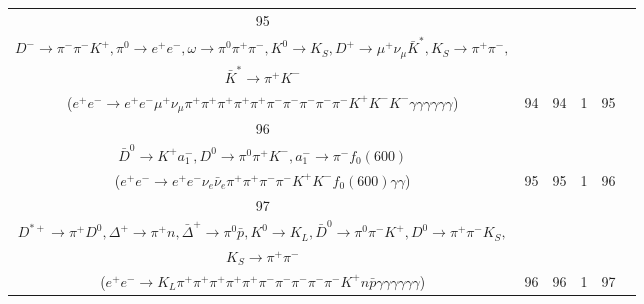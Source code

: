 \documentclass[landscape]{article}
\begin{document}
\begin{table}[htbp!]
\begin{tabular}{|c|c|c|c|c|c|}
\hline
95 & \makecell{ $ 
e^{+} e^{-} \rightarrow \Upsilon(4S) ,
\Upsilon(4S) \rightarrow B^{0} \bar{B}^{0} ,
B^{0} \rightarrow \rho^{+} \omega D^{-} ,
\bar{B}^{0} \rightarrow \pi^{0} \omega K^{0} K^{-} D^{+} ,
\rho^{+} \rightarrow \pi^{0} \pi^{+} ,
\omega \rightarrow \pi^{0} \pi^{+} \pi^{-} ,
$ \\ $
D^{-} \rightarrow \pi^{-} \pi^{-} K^{+} ,
\pi^{0} \rightarrow e^{+} e^{-} ,
\omega \rightarrow \pi^{0} \pi^{+} \pi^{-} ,
K^{0} \rightarrow K_{S} ,
D^{+} \rightarrow \mu^{+} \nu_{\mu} \bar{K}^{*} ,
K_{S} \rightarrow \pi^{+} \pi^{-} ,
$ \\ $
\bar{K}^{*} \rightarrow \pi^{+} K^{-} 
$ \\ ($
e^{+} e^{-} \rightarrow e^{+} e^{-} \mu^{+} \nu_{\mu} \pi^{+} \pi^{+} \pi^{+} \pi^{+} \pi^{+} \pi^{-} \pi^{-} \pi^{-} \pi^{-} \pi^{-} K^{+} K^{-} K^{-} \gamma \gamma \gamma \gamma \gamma \gamma 
$) } & 94 & 94 & 1 & 95 \\
\hline
96 & \makecell{ $ 
e^{+} e^{-} \rightarrow \Upsilon(4S) ,
\Upsilon(4S) \rightarrow B^{0} \bar{B}^{0} ,
B^{0} \rightarrow e^{+} \nu_{e} \bar{D}^{*-} ,
\bar{B}^{0} \rightarrow e^{-} \bar{\nu}_{e} D^{*+} ,
\bar{D}^{*-} \rightarrow \pi^{-} \bar{D}^{0} ,
D^{*+} \rightarrow \pi^{+} D^{0} ,
$ \\ $
\bar{D}^{0} \rightarrow K^{+} a_{1}^{-} ,
D^{0} \rightarrow \pi^{0} \pi^{+} K^{-} ,
a_{1}^{-} \rightarrow \pi^{-} f_{0}(600) 
$ \\ ($
e^{+} e^{-} \rightarrow e^{+} e^{-} \nu_{e} \bar{\nu}_{e} \pi^{+} \pi^{+} \pi^{-} \pi^{-} K^{+} K^{-} f_{0}(600) \gamma \gamma 
$) } & 95 & 95 & 1 & 96 \\
\hline
97 & \makecell{ $ 
e^{+} e^{-} \rightarrow \Upsilon(4S) ,
\Upsilon(4S) \rightarrow B^{0} \bar{B}^{0} ,
B^{0} \rightarrow K^{*+} \bar{D}^{*-} ,
\bar{B}^{0} \rightarrow \pi^{0} \pi^{-} D^{*+} \Delta^{+} \bar{\Delta}^{+} ,
K^{*+} \rightarrow \pi^{+} K^{0} ,
\bar{D}^{*-} \rightarrow \pi^{-} \bar{D}^{0} ,
$ \\ $
D^{*+} \rightarrow \pi^{+} D^{0} ,
\Delta^{+} \rightarrow \pi^{+} n ,
\bar{\Delta}^{+} \rightarrow \pi^{0} \bar{p} ,
K^{0} \rightarrow K_{L} ,
\bar{D}^{0} \rightarrow \pi^{0} \pi^{-} K^{+} ,
D^{0} \rightarrow \pi^{+} \pi^{-} K_{S} ,
$ \\ $
K_{S} \rightarrow \pi^{+} \pi^{-} 
$ \\ ($
e^{+} e^{-} \rightarrow K_{L} \pi^{+} \pi^{+} \pi^{+} \pi^{+} \pi^{+} \pi^{-} \pi^{-} \pi^{-} \pi^{-} \pi^{-} K^{+} n \bar{p} \gamma \gamma \gamma \gamma \gamma \gamma 
$) } & 96 & 96 & 1 & 97 \\

\end{tabular}
\end{table}
\end{document}
